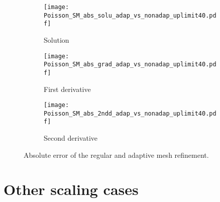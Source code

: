 \documentclass[final,3p]{elsarticle}
\begin{document}
\begin{figure}[!ht]
    \begin{subfigure}{5.5cm}
        \texttt{[image: Poisson\_SM\_abs\_solu\_adap\_vs\_nonadap\_uplimit40.pdf]}
        \caption{Solution}
        \label{Fig:Poisson_SM_abs_solu_adap_vs_nonadap_uplimit40}
    \end{subfigure}
    \begin{subfigure}{5.5cm}
        \texttt{[image: Poisson\_SM\_abs\_grad\_adap\_vs\_nonadap\_uplimit40.pdf]}
        \caption{First derivative}
        \label{Fig:Poisson_SM_abs_grad_adap_vs_nonadap_uplimit40}
    \end{subfigure}
    \begin{subfigure}{5.5cm}
        \texttt{[image: Poisson\_SM\_abs\_2ndd\_adap\_vs\_nonadap\_uplimit40.pdf]}
        \caption{Second derivative}
        \label{Fig:Poisson_SM_abs_2ndd_adap_vs_nonadap_uplimit40}
    \end{subfigure}
\caption{Absolute error of the regular and adaptive mesh refinement.}
\label{Fig:Pois_SM_DBC_abs_adap_vs_nonadap_uplimit40}
\end{figure}

\newpage
\section{Other scaling cases }   \label{other scaling cases}
\end{document}
